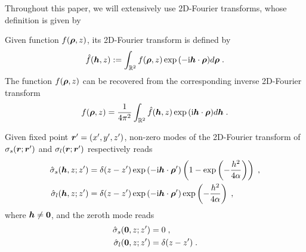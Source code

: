 Throughout this paper, we will extensively use 2D-Fourier transforms, whose definition is given by
\begin{defination}
    Given function $f(\boldsymbol{\rho}, z)$, its 2D-Fourier transform is defined by
    \begin{equation}
        \Hat{f}(\boldsymbol{h}, z):=\int_{\mathbb{R}^2}f(\boldsymbol{\rho},z)\exp{(-\mathrm{i} \boldsymbol{h} \cdot \boldsymbol{\rho})} d \boldsymbol{\rho} \;.
    \end{equation}
    The function  $f(\boldsymbol{\rho}, z)$ can be  recovered from the corresponding inverse 2D-Fourier transform
    \begin{equation} 
        f(\boldsymbol{\rho}, z)=\frac{1}{4\pi^2}\int_{\mathbb{R}^2}\Hat{f}(\boldsymbol{h}, z)\exp{(\mathrm{i} \boldsymbol{h} \cdot \boldsymbol{\rho})} d \boldsymbol{h} \;.
    \end{equation}
\end{defination} 
\begin{prop}
Given fixed point $\boldsymbol{r}^\prime=(x^{\prime}, y^{\prime},z^{\prime})$, non-zero modes of the 2D-Fourier
transform  of  $ \sigma_{s}(\boldsymbol{r};\bm{r}^\prime)$ and   $\sigma_{l}(\boldsymbol{r};\bm{r}^\prime)$  respectively reads
\begin{align*}
 \Hat{\sigma}_{s}(\boldsymbol{h},z;z^\prime) &= \delta(z-z^\prime) \exp{(-\mathrm{i} \boldsymbol{h} \cdot \boldsymbol{\rho}^\prime)}\left(1-\exp\left(-\frac{h^2}{4\alpha}\right)\right)\;,  \\
 \Hat{\sigma}_{l}(\boldsymbol{h},z;z^\prime) &= \delta(z-z^\prime) \exp{(-\mathrm{i} \boldsymbol{h} \cdot \boldsymbol{\rho}^\prime)}\exp\left(-\frac{h^2}{4\alpha}\right)\;,
\end{align*}   
where $\boldsymbol{h}\neq\bm{0}$, and the zeroth mode reads
\begin{align*}
 \Hat{\sigma}_{s}(\bm{0},z;z^\prime) &= 0\;,  \\
 \Hat{\sigma}_{l}(\bm{0},z;z^\prime) &= \delta(z-z^\prime)\;.
\end{align*}   
\end{prop}
